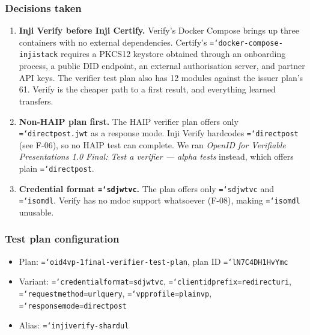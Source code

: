 \documentclass[11pt,a4paper]{article}
\newcommand{\tightlist}{\setlength{\itemsep}{0pt}\setlength{\parskip}{0pt}\setlength{\parsep}{0pt}}
\let\origtexttt\texttt
\renewcommand{\texttt}[1]{\origtexttt{\hyphenchar\font=`\-\relax #1}}
\renewcommand{\_}{\textunderscore\allowbreak}
\begin{document}
\subsubsection*{Decisions taken}
\begin{enumerate}\tightlist
  \item \textbf{Inji Verify before Inji Certify.} Verify's Docker Compose brings up three
        containers with no external dependencies. Certify's \texttt{docker-compose-injistack}
        requires a PKCS12 keystore obtained through an onboarding process, a public DID
        endpoint, an external authorisation server, and partner API keys. The verifier test
        plan also has 12 modules against the issuer plan's 61. Verify is the cheaper path to
        a first result, and everything learned transfers.
  \item \textbf{Non-HAIP plan first.} The HAIP verifier plan offers only
        \texttt{direct\_post.jwt} as a response mode. Inji Verify hardcodes
        \texttt{direct\_post} (see F-06), so no HAIP test can complete. We ran
        \emph{OpenID for Verifiable Presentations 1.0 Final: Test a verifier --- alpha tests}
        instead, which offers plain \texttt{direct\_post}.
  \item \textbf{Credential format \texttt{sd\_jwt\_vc}.} The plan offers only
        \texttt{sd\_jwt\_vc} and \texttt{iso\_mdl}. Verify has no mdoc support whatsoever
        (F-08), making \texttt{iso\_mdl} unusable.
\end{enumerate}

\subsubsection*{Test plan configuration}
\begin{itemize}\tightlist
  \item Plan: \texttt{oid4vp-1final-verifier-test-plan}, plan ID \texttt{lN7C4DH1HvYmc}
  \item Variant: \texttt{credential\_format=sd\_jwt\_vc}, \texttt{client\_id\_prefix=redirect\_uri},
        \texttt{request\_method=url\_query}, \texttt{vp\_profile=plain\_vp},
        \texttt{response\_mode=direct\_post}
  \item Alias: \texttt{injiverify-shardul}
\end{itemize}
\end{document}
